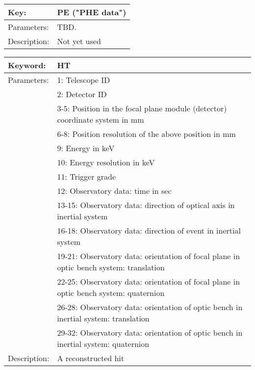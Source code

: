 \begin{table}[htdp]
\begin{center}
\begin{tabular}{|p{2cm}|p{12cm}|}
\hline
Key:&	PE ("PHE data")\\
\hline
Parameters:&	TBD.\\
\hline
Description:&	Not yet used\\
\hline
\end{tabular}
\end{center}
\end{table}

\begin{table}[htdp]
\begin{center}
\begin{tabular}{|p{2cm}|p{12cm}|}
\hline
Keyword:&	HT\\
\hline
Parameters:&	1: Telescope ID\\
&2: Detector ID\\
&3-5: Position in the focal plane module (detector) coordinate system in mm\\
&6-8: Position resolution of the above position in mm\\
&9: Energy in keV\\
&10: Energy resolution in keV\\
&11: Trigger grade\\
&12: Observatory data: time in sec\\
&13-15: Observatory data: direction of optical axis in inertial system\\
&16-18: Observatory data: direction of event in inertial system\\
&19-21: Observatory data: orientation of focal plane in optic bench system: translation\\
&22-25: Observatory data: orientation of focal plane in optic bench system: quaternion\\
&26-28: Observatory data: orientation of optic bench in inertial system: translation\\
&29-32: Observatory data: orientation of optic bench in inertial system: quaternion\\
\hline
Description:&	A reconstructed hit\\
\hline
\end{tabular}
\end{center}
\end{table}

